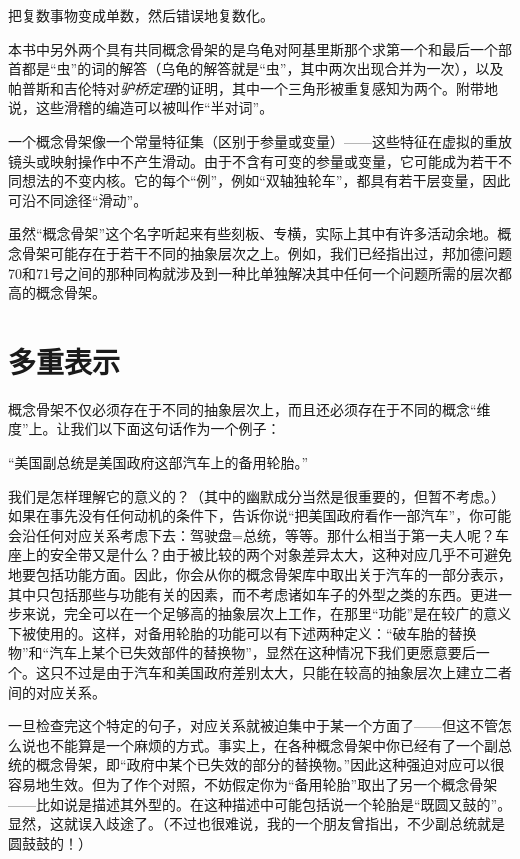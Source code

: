 \begin{block}
把复数事物变成单数，然后错误地复数化。
\end{block}

本书中另外两个具有共同概念骨架的是乌龟对阿基里斯那个求第一个和最后一个部首都是“虫”的词的解答（乌龟的解答就是“虫”，其中两次出现合并为一次），以及帕普斯和吉伦特对\emph{驴桥定理}的证明，其中一个三角形被重复感知为两个。附带地说，这些滑稽的编造可以被叫作“半对词”。

一个概念骨架像一个常量特征集（区别于参量或变量）——这些特征在虚拟的重放镜头或映射操作中不产生滑动。由于不含有可变的参量或变量，它可能成为若干不同想法的不变内核。它的每个“例”，例如“双轴独轮车”，都具有若干层变量，因此可沿不同途径“滑动”。

虽然“概念骨架”这个名字听起来有些刻板、专横，实际上其中有许多活动余地。概念骨架可能存在于若干不同的抽象层次之上。例如，我们已经指出过，邦加德问题70和71号之间的那种同构就涉及到一种比单独解决其中任何一个问题所需的层次都高的概念骨架。

\section{多重表示}

概念骨架不仅必须存在于不同的抽象层次上，而且还必须存在于不同的概念“维度”上。让我们以下面这句话作为一个例子：

\begin{block}
“美国副总统是美国政府这部汽车上的备用轮胎。”
\end{block}

我们是怎样理解它的意义的？（其中的幽默成分当然是很重要的，但暂不考虑。）如果在事先没有任何动机的条件下，告诉你说“把美国政府看作一部汽车”，你可能会沿任何对应关系考虑下去：驾驶盘=总统，等等。那什么相当于第一夫人呢？车座上的安全带又是什么？由于被比较的两个对象差异太大，这种对应几乎不可避免地要包括功能方面。因此，你会从你的概念骨架库中取出关于汽车的一部分表示，其中只包括那些与功能有关的因素，而不考虑诸如车子的外型之类的东西。更进一步来说，完全可以在一个足够高的抽象层次上工作，在那里“功能”是在较广的意义下被使用的。这样，对备用轮胎的功能可以有下述两种定义：“破车胎的替换物”和“汽车上某个已失效部件的替换物”，显然在这种情况下我们更愿意要后一个。这只不过是由于汽车和美国政府差别太大，只能在较高的抽象层次上建立二者间的对应关系。

一旦检查完这个特定的句子，对应关系就被迫集中于某一个方面了——但这不管怎么说也不能算是一个麻烦的方式。事实上，在各种概念骨架中你已经有了一个副总统的概念骨架，即“政府中某个已失效的部分的替换物。”因此这种强迫对应可以很容易地生效。但为了作个对照，不妨假定你为“备用轮胎”取出了另一个概念骨架——比如说是描述其外型的。在这种描述中可能包括说一个轮胎是“既圆又鼓的”。显然，这就误入歧途了。（不过也很难说，我的一个朋友曾指出，不少副总统就是圆鼓鼓的！）

